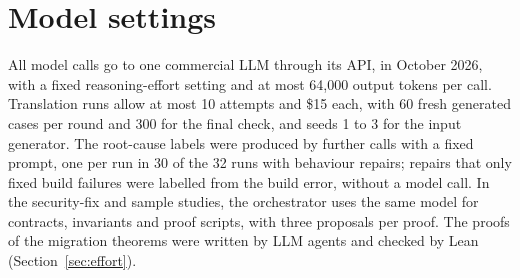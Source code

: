 \section{Model settings}
\label{app:llm}


All model calls go to one commercial LLM through its API, in October 2026, with a fixed reasoning-effort setting and at
most 64,000 output tokens per call. Translation runs allow at most 10 attempts and \$15 each, with 60 fresh generated
cases per round and 300 for the final check, and seeds 1 to 3 for the input generator. The root-cause labels were produced by further calls with a fixed prompt, one per run in 30 of the 32 runs with behaviour
repairs; repairs that only fixed build failures were labelled from the build error, without a model call. In the security-fix and sample studies, the orchestrator uses the
same model for contracts, invariants and proof scripts, with three proposals per proof. The proofs of the migration
theorems were written by LLM agents and checked by Lean (Section~\ref{sec:effort}).

